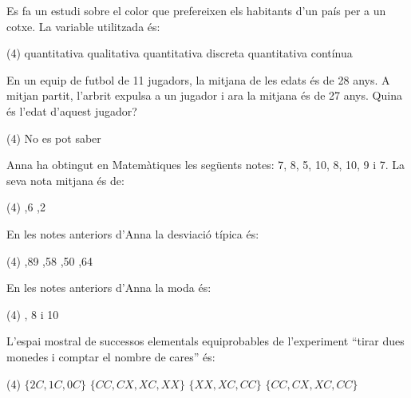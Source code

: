 \begin{autoaval}{51}
\begin{mylist}
 \exer[2] Es fa un estudi sobre el color que prefereixen els habitants d'un país per a un cotxe. La variable utilitzada és:
\begin{tasks}(4)
	\task  quantitativa  
	\task  qualitativa  
	\task  quantitativa discreta  
	\task  quantitativa contínua
\end{tasks}

\exer En un equip de futbol de 11 jugadors, la mitjana de les edats és de 28 anys. A mitjan partit, l'arbrit expulsa a un jugador i ara la mitjana és de 27 anys. Quina és l'edat d'aquest jugador?  
\begin{tasks}(4)
	\task  No es pot saber
\end{tasks}

 \exer Anna ha obtingut en Matemàtiques les següents notes: 7, 8, 5, 10, 8, 10, 9 i 7. La seva nota mitjana és de:
\begin{tasks}(4)
	,6  
	,2  
\end{tasks}

 \exer En les notes anteriors d'Anna la desviació típica és:
\begin{tasks}(4)
	,89 
	,58  
	,50 
	,64
\end{tasks}

 \exer En les notes anteriors d'Anna la moda és:
\begin{tasks}(4)
	, 8 i 10
\end{tasks}

 \exer L'espai mostral de successos elementals equiprobables de l'experiment ``tirar dues monedes i comptar el nombre de cares'' és:
\begin{tasks}(4)
	\task  $\{2C, 1C, 0C\}$  
	\task  $\{CC, CX, XC, XX\}$  
	\task  $\{XX, XC, CC\}$  
	\task  $\{CC, CX, XC, CC\}$
\end{tasks}


\end{mylist}
\end{autoaval}
